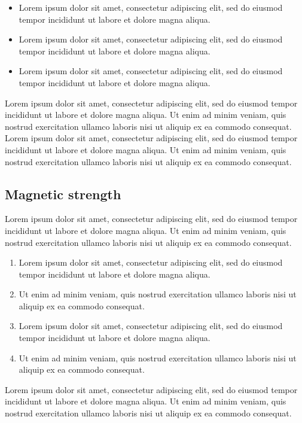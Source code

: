 \documentclass[a4paper]{book}
\begin{document}
\begin{itemize}
\item Lorem ipsum dolor sit amet, consectetur adipiscing elit, sed do eiusmod tempor
incididunt ut labore et dolore magna aliqua.
\item Lorem ipsum dolor sit amet, consectetur adipiscing elit, sed do eiusmod tempor
incididunt ut labore et dolore magna aliqua.
\item Lorem ipsum dolor sit amet, consectetur adipiscing elit, sed do eiusmod tempor
incididunt ut labore et dolore magna aliqua.
\end{itemize}

Lorem ipsum dolor sit amet, consectetur adipiscing elit, sed do eiusmod tempor
incididunt ut labore et dolore magna aliqua. Ut enim ad minim veniam, quis
nostrud exercitation ullamco laboris nisi ut aliquip ex ea commodo consequat.
Lorem ipsum dolor sit amet, consectetur adipiscing elit, sed do eiusmod tempor
incididunt ut labore et dolore magna aliqua. Ut enim ad minim veniam, quis
nostrud exercitation ullamco laboris nisi ut aliquip ex ea commodo consequat.

\subsection{Magnetic strength}

Lorem ipsum dolor sit amet, consectetur adipiscing elit, sed do eiusmod tempor
incididunt ut labore et dolore magna aliqua. Ut enim ad minim veniam, quis
nostrud exercitation ullamco laboris nisi ut aliquip ex ea commodo consequat.

\begin{enumerate}
\item Lorem ipsum dolor sit amet, consectetur adipiscing elit, sed do eiusmod tempor
incididunt ut labore et dolore magna aliqua.
\item Ut enim ad minim veniam, quis
nostrud exercitation ullamco laboris nisi ut aliquip ex ea commodo consequat.
\item Lorem ipsum dolor sit amet, consectetur adipiscing elit, sed do eiusmod tempor
incididunt ut labore et dolore magna aliqua.
\item Ut enim ad minim veniam, quis
nostrud exercitation ullamco laboris nisi ut aliquip ex ea commodo consequat.
\end{enumerate}

Lorem ipsum dolor sit amet, consectetur adipiscing elit, sed do eiusmod tempor
incididunt ut labore et dolore magna aliqua. Ut enim ad minim veniam, quis
nostrud exercitation ullamco laboris nisi ut aliquip ex ea commodo consequat.
\end{document}
